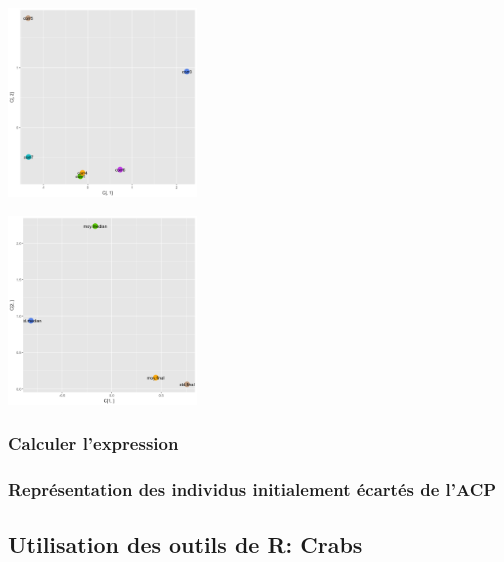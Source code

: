 \documentclass[10pt]{article}
\begin{document}
	\begin{minipage}{0.5\textwidth}
		\includegraphics[width=50mm]{Figures/Notes_PCA/individus_comp.png}
		\label{fig:individus_comp}	
	\end{minipage}
	\begin{minipage}{0.5\textwidth}
		\includegraphics[width=50mm]{Figures/Notes_PCA/variables_comp.png}
		\label{fig:var_comp}	
	\end{minipage}
	
	\subsubsection{ Calculer l’expression}
	
	\subsubsection{Représentation des individus initialement écartés de l’ACP}
	
	
	\subsection{Utilisation des outils de R: Crabs}
\end{document}
